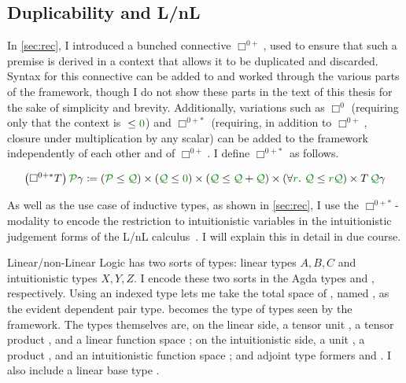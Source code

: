 

\subsection{Duplicability and L/nL}\label{sec:dup-lnl}
In \cref{sec:rec}, I introduced a bunched connective $\Box^{0{+}}$, used to
ensure that such a premise is derived in a context that allows it to be
duplicated and discarded.
Syntax for this connective can be added to  and worked
through the various parts of the framework, though I do not show these parts in
the text of this thesis for the sake of simplicity and brevity.
Additionally, variations such as $\Box^0$ (requiring only that the context is
${} \leq \gr0$) and $\Box^{0{+}{*}}$ (requiring, in addition to
$\Box^{0{+}}$, closure under multiplication by any scalar) can be added to the
framework independently of each other and of $\Box^{0{+}}$.
I define $\Box^{0{+}{*}}$ as follows.

\[
  \plr{\Box^{0{+}{*}}T}\,\grP\gamma \coloneqq
  \plr{\grP \leq \grQ} \times
  \plr{\grQ \leq \gr0} \times \plr{\grQ \leq \grQ + \grQ} \times
  \plr{\forall\gr r.~\grQ \leq \gr r\grQ} \times T\,\grQ\gamma
\]

As well as the use case of inductive types, as shown in \cref{sec:rec}, I use
the $\Box^{0{+}{*}}$-modality to encode the restriction to intuitionistic
variables in the intuitionistic judgement forms of the L/nL
calculus~\citep{Benton94}.
I will explain this in detail in due course.

Linear/non-Linear Logic has two sorts of types: linear types $A, B, C$ and
intuitionistic types $X, Y, Z$.
I encode these two sorts in the Agda types
\AgdaSpace{} and
\AgdaSpace{}, respectively.
Using an indexed type lets me take the total space of , named
, as the evident dependent pair type.
 becomes the type of types seen by the framework.
The types themselves are, on the linear side,
a tensor unit ,
a tensor product , and
a linear function space ;
on the intuitionistic side,
a unit ,
a product , and
an intuitionistic function space ;
and adjoint type formers  and
.
I also include a linear base type \AgdaInductiveConstructor{$\iota$}.

